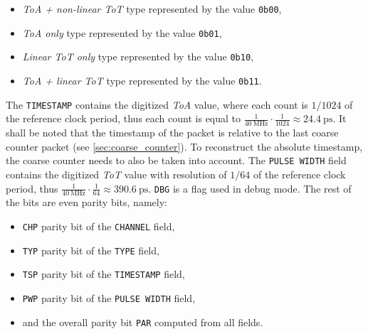 \begin{itemize}
    \item \emph{ToA + non-linear ToT} type represented by the value \verb|0b00|,
    \item \emph{ToA only} type represented by the value \verb|0b01|,
    \item \emph{Linear ToT only} type represented by the value \verb|0b10|,
    \item \emph{ToA + linear ToT} type represented by the value \verb|0b11|.
\end{itemize}
%
The \verb|TIMESTAMP| contains the digitized \emph{ToA} value, where each count is $1/1024$ of the reference clock period, thus each count is equal to $\frac{1}{\SI{40}{\mega\hertz}} \cdot \frac{1}{1024} \approx \SI{24.4}{\pico\second} $. It shall be noted that the timestamp of the packet is relative to the last coarse counter packet (see \ref{sec:coarse_counter}). To reconstruct the absolute timestamp, the coarse counter needs to also be taken into account. The \verb|PULSE WIDTH| field contains the digitized \emph{ToT} value with resolution of $1/64$ of the reference clock period, thus $\frac{1}{\SI{40}{\mega\hertz}} \cdot \frac{1}{64} \approx \SI{390.6}{\pico\second}$. \verb|DBG| is a flag used in debug mode. \cite{ficDatasheet}  The rest of the bits are even parity bits, namely:
\begin{itemize}
    \item \verb|CHP| parity bit of the \verb|CHANNEL| field,
    \item \verb|TYP| parity bit of the \verb|TYPE| field,
    \item \verb|TSP| parity bit of the \verb|TIMESTAMP| field,
    \item \verb|PWP| parity bit of the \verb|PULSE WIDTH| field,
    \item and the overall parity bit \verb|PAR| computed from all fields.
\end{itemize}

